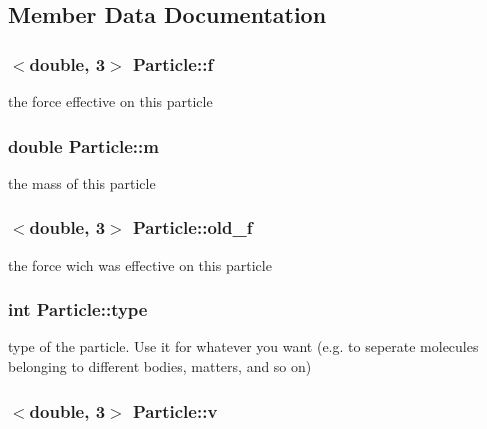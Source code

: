 \subsection{Member Data Documentation}
\hypertarget{classParticle_ad9aa3e171ea950b2cff1b4825e67845b}{
\subsubsection[{f}]{$<$double, 3$>$ Particle\+::f\hspace{0.3cm}{\ttfamily [private]}}}\label{classParticle_ad9aa3e171ea950b2cff1b4825e67845b}
the force effective on this particle \hypertarget{classParticle_aedcc7e1bc53b0e2b1a4a07c9a1b47563}{
\subsubsection[{m}]{\setlength{\rightskip}{0pt plus 5cm}double Particle\+::m\hspace{0.3cm}{\ttfamily [private]}}}\label{classParticle_aedcc7e1bc53b0e2b1a4a07c9a1b47563}
the mass of this particle \hypertarget{classParticle_ad9281e33474f23f7261f28848affc4a4}{
\subsubsection[{old\+\_\+f}]{$<$double, 3$>$ Particle\+::old\+\_\+f\hspace{0.3cm}{\ttfamily [private]}}}\label{classParticle_ad9281e33474f23f7261f28848affc4a4}
the force wich was effective on this particle \hypertarget{classParticle_a2b73dd42bcd56ba2e7ffeb0a5515a866}{
\subsubsection[{type}]{\setlength{\rightskip}{0pt plus 5cm}int Particle\+::type\hspace{0.3cm}{\ttfamily [private]}}}\label{classParticle_a2b73dd42bcd56ba2e7ffeb0a5515a866}
type of the particle. Use it for whatever you want (e.\+g. to seperate molecules belonging to different bodies, matters, and so on) \hypertarget{classParticle_ac3669e50d83d8608d522965b9acd1d8b}{
\subsubsection[{v}]{$<$double, 3$>$ Particle\+::v\hspace{0.3cm}{\ttfamily [private]}}}\label{classParticle_ac3669e50d83d8608d522965b9acd1d8b}
